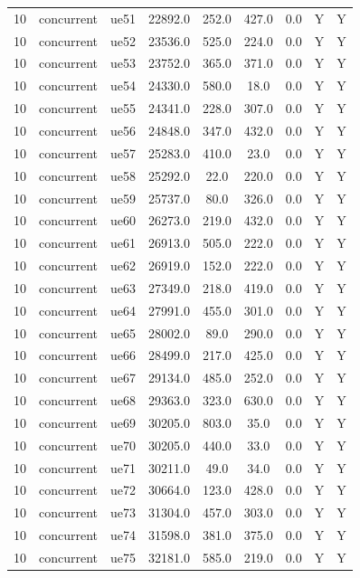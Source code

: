 \begin{table}[ht]
\begin{tabular}{|c|c|c|c|c|c|c|c|c|}
10 & concurrent & ue51 & 22892.0 & 252.0 & 427.0 & 0.0 & Y & Y \\
10 & concurrent & ue52 & 23536.0 & 525.0 & 224.0 & 0.0 & Y & Y \\
10 & concurrent & ue53 & 23752.0 & 365.0 & 371.0 & 0.0 & Y & Y \\
10 & concurrent & ue54 & 24330.0 & 580.0 & 18.0 & 0.0 & Y & Y \\
10 & concurrent & ue55 & 24341.0 & 228.0 & 307.0 & 0.0 & Y & Y \\
10 & concurrent & ue56 & 24848.0 & 347.0 & 432.0 & 0.0 & Y & Y \\
10 & concurrent & ue57 & 25283.0 & 410.0 & 23.0 & 0.0 & Y & Y \\
10 & concurrent & ue58 & 25292.0 & 22.0 & 220.0 & 0.0 & Y & Y \\
10 & concurrent & ue59 & 25737.0 & 80.0 & 326.0 & 0.0 & Y & Y \\
10 & concurrent & ue60 & 26273.0 & 219.0 & 432.0 & 0.0 & Y & Y \\
10 & concurrent & ue61 & 26913.0 & 505.0 & 222.0 & 0.0 & Y & Y \\
10 & concurrent & ue62 & 26919.0 & 152.0 & 222.0 & 0.0 & Y & Y \\
10 & concurrent & ue63 & 27349.0 & 218.0 & 419.0 & 0.0 & Y & Y \\
10 & concurrent & ue64 & 27991.0 & 455.0 & 301.0 & 0.0 & Y & Y \\
10 & concurrent & ue65 & 28002.0 & 89.0 & 290.0 & 0.0 & Y & Y \\
10 & concurrent & ue66 & 28499.0 & 217.0 & 425.0 & 0.0 & Y & Y \\
10 & concurrent & ue67 & 29134.0 & 485.0 & 252.0 & 0.0 & Y & Y \\
10 & concurrent & ue68 & 29363.0 & 323.0 & 630.0 & 0.0 & Y & Y \\
10 & concurrent & ue69 & 30205.0 & 803.0 & 35.0 & 0.0 & Y & Y \\
10 & concurrent & ue70 & 30205.0 & 440.0 & 33.0 & 0.0 & Y & Y \\
10 & concurrent & ue71 & 30211.0 & 49.0 & 34.0 & 0.0 & Y & Y \\
10 & concurrent & ue72 & 30664.0 & 123.0 & 428.0 & 0.0 & Y & Y \\
10 & concurrent & ue73 & 31304.0 & 457.0 & 303.0 & 0.0 & Y & Y \\
10 & concurrent & ue74 & 31598.0 & 381.0 & 375.0 & 0.0 & Y & Y \\
10 & concurrent & ue75 & 32181.0 & 585.0 & 219.0 & 0.0 & Y & Y \\

\end{tabular}
\end{table}
